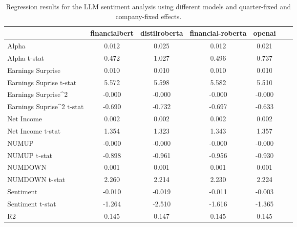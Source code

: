 \begin{table}
\caption{Regression results for the LLM sentiment analysis using different models and quarter-fixed and company-fixed effects.}
\label{tab:llm_regressions_cq_fixed}
\begin{tabular}{lcccccc}
\toprule
 & financialbert & distilroberta & financial-roberta & openai \\
\midrule
Alpha & 0.012 & 0.025 & 0.012 & 0.021 \\
Alpha t-stat & 0.472 & 1.027 & 0.496 & 0.737 \\
Earnings Surprise & 0.010 & 0.010 & 0.010 & 0.010 \\
Earnings Suprise t-stat & 5.572 & 5.598 & 5.582 & 5.510 \\
Earnings Surprise^2 & -0.000 & -0.000 & -0.000 & -0.000 \\
Earnings Suprise^2 t-stat & -0.690 & -0.732 & -0.697 & -0.633 \\
Net Income & 0.002 & 0.002 & 0.002 & 0.002 \\
Net Income t-stat & 1.354 & 1.323 & 1.343 & 1.357 \\
NUMUP & -0.000 & -0.000 & -0.000 & -0.000 \\
NUMUP t-stat & -0.898 & -0.961 & -0.956 & -0.930 \\
NUMDOWN & 0.001 & 0.001 & 0.001 & 0.001 \\
NUMDOWN t-stat & 2.260 & 2.214 & 2.230 & 2.224 \\
Sentiment & -0.010 & -0.019 & -0.011 & -0.003 \\
Sentiment t-stat & -1.264 & -2.510 & -1.616 & -1.365 \\
R2 & 0.145 & 0.147 & 0.145 & 0.145 \\
\bottomrule
\end{tabular}
\end{table}
